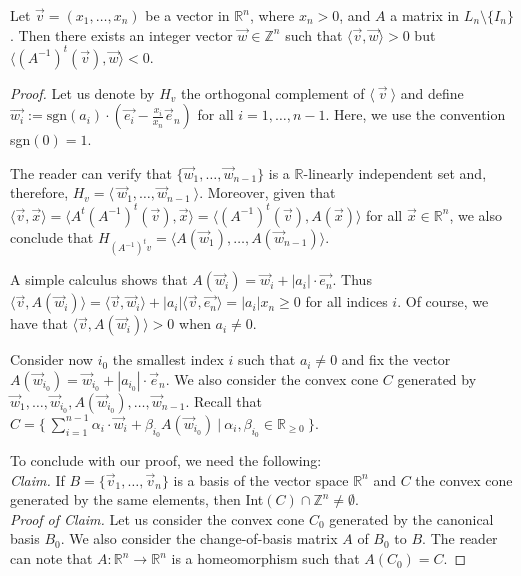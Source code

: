 \documentclass[10pt,a4paper]{amsart}
\begin{document}
\begin{lem}
\label{lemacono}
    Let $\vec{v}=(x_1,\dots,x_n)$ be a vector in $\mathbb{R}^n$, where $x_n>0$, and $A$ a matrix in $L_n\setminus\{I_n\}$.
    Then there exists an integer vector $\vec{w}\in \mathbb{Z}^n$ such that $\langle \vec{v} , \vec{w} \rangle>0$ but $\langle (A^{-1})^t(\vec{v}) , \vec{w} \rangle<0.$
\end{lem}

\begin{proof}
Let us denote by $H_{v}$ the orthogonal complement of $\langle\ \vec{v}\ \rangle$ and define $\vec{w_i}:= \text{sgn}(a_i)\cdot(\vec{e_i}-\frac{x_i}{x_n}\vec{e}_n)$ for all $i=1,\dots,n-1$. 
Here, we use the convention sgn$(0)=1$. 

The reader can verify that $\{\vec{w}_1,\dots, \vec{w}_{n-1}\}$ is a $\mathbb{R}$-linearly independent set and, therefore, $H_v=\langle\ \vec{w}_1,\dots, \vec{w}_{n-1}\ \rangle$.
Moreover, given that $\langle\vec{v},\vec{x}\rangle=\langle A^t(A^{-1})^t(\vec{v}),\vec{x}\rangle =\langle (A^{-1})^t(\vec{v}),A(\vec{x})\rangle$ for all $\vec{x}\in \mathbb{R}^n$, we also conclude that $H_{(A^{-1})^tv}=\langle A(\vec{w}_1),\dots, A(\vec{w}_{n-1})\rangle.$

A simple calculus shows that $A(\vec{w}_i)=\vec{w}_i+|a_i|\cdot \vec{e_n}$. Thus $\langle \vec{v},A(\vec{w}_i)\rangle=\langle\vec{v},\vec{w}_i\rangle +|a_i|\langle \vec{v},\vec{e_n}\rangle=|a_i|x_n\geq 0$ for all indices $i$.
Of course, we have that $\langle\vec{v},A(\vec{w}_i)\rangle>0$ when $a_i\neq 0.$

Consider now $i_0$ the smallest index $i$ such that $a_i\neq 0$ and fix the vector $A(\vec{w}_{i_0})=\vec{w}_{i_0}+|a_{i_0}|\cdot\vec{e}_n$. We also consider the convex cone $C$ generated by $\vec{w}_1,\dots, \vec{w}_{i_0},A(\vec{w}_{i_0}),\dots, \vec{w}_{n-1}$. Recall that $C=\{\ \sum_{i=1}^{n-1}\alpha_i\cdot\vec{w}_i  + \beta_{i_0}A(\vec{w}_{i_0})\ |\ \alpha_{i},\beta_{i_0}\in \mathbb{R}_{\geq 0}\ \}$.

 To conclude with our proof, we need the following:\\ 

    \noindent\textit{Claim.} If $B=\{\vec{v}_1,\dots, \vec{v}_n\}$ is a basis of the vector space $\mathbb{R}^n$ and $C$ the convex cone generated by the same elements, then Int$(C)\cap \mathbb{Z}^n\neq \emptyset$.\\

    \noindent\textit{Proof of Claim.} Let us consider the convex cone $C_0$ generated by the canonical basis $B_0$. We also consider the change-of-basis matrix $A$ of $B_0$ to $B$. The reader can note that $A: \mathbb{R}^n\rightarrow \mathbb{R}^n$ is a homeomorphism such that $A(C_0)=C$. 
    

\end{proof}
\end{document}
